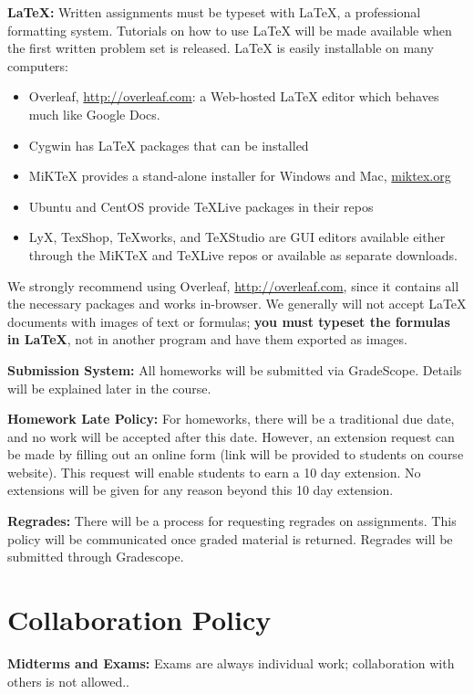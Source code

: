 \documentclass[12pt]{article}
\begin{document}
\textbf{\LaTeX:} Written assignments must be typeset with \LaTeX, a professional formatting system. Tutorials on how to use \LaTeX{} will be made available when the first written problem set is released. \LaTeX{} is easily installable on many computers: 
\begin{itemize}
    \item Overleaf, \url{http://overleaf.com}: a Web-hosted \LaTeX{} editor which behaves much like Google Docs.
    \item Cygwin has \LaTeX{} packages that can be installed
    \item MiKTeX provides a stand-alone installer for Windows and Mac, \url{miktex.org}
    \item Ubuntu and CentOS provide TeXLive packages in their repos
    \item LyX, TexShop, TeXworks, and TeXStudio are GUI editors available either through the MiKTeX and TeXLive repos or available as separate downloads.
\end{itemize}
We strongly recommend using Overleaf, \url{http://overleaf.com}, since it contains all the necessary packages and works in-browser. We generally will not accept \LaTeX{} documents with images of text or formulas; \textbf{you must typeset the formulas in \LaTeX}, not in another program and have them exported as images.

\textbf{Submission System:} All homeworks will be submitted via GradeScope. Details will be explained later in the course. 

\textbf{Homework Late Policy:} For homeworks, there will be a traditional due date, and no work will be accepted after this date. However, an extension request can be made by filling out an online form (link will be provided to students on course website). This request will enable students to earn a 10 day extension. No extensions will be given for any reason beyond this 10 day extension.

\textbf{Regrades:} There will be a process for requesting regrades on assignments. This policy will be communicated once graded material is returned. Regrades will be submitted through Gradescope.

\section*{Collaboration Policy}

\textbf{Midterms and Exams:} Exams are always individual work; collaboration with others is not allowed..
\end{document}
